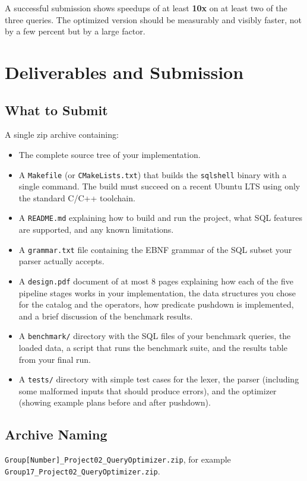 \documentclass[11pt,a4paper]{article}
\begin{document}
A successful submission shows speedups of at least \textbf{10x} on at least two of the three queries. The optimized version should be measurably and visibly faster, not by a few percent but by a large factor.

\section{Deliverables and Submission}

\subsection{What to Submit}
A single zip archive containing:
\begin{itemize}
\item The complete source tree of your implementation.
\item A \texttt{Makefile} (or \texttt{CMakeLists.txt}) that builds the \texttt{sqlshell} binary with a single command. The build must succeed on a recent Ubuntu LTS using only the standard C/C++ toolchain.
\item A \texttt{README.md} explaining how to build and run the project, what SQL features are supported, and any known limitations.
\item A \texttt{grammar.txt} file containing the EBNF grammar of the SQL subset your parser actually accepts.
\item A \texttt{design.pdf} document of at most 8 pages explaining how each of the five pipeline stages works in your implementation, the data structures you chose for the catalog and the operators, how predicate pushdown is implemented, and a brief discussion of the benchmark results.
\item A \texttt{benchmark/} directory with the SQL files of your benchmark queries, the loaded data, a script that runs the benchmark suite, and the results table from your final run.
\item A \texttt{tests/} directory with simple test cases for the lexer, the parser (including some malformed inputs that should produce errors), and the optimizer (showing example plans before and after pushdown).
\end{itemize}

\subsection{Archive Naming}
\texttt{Group[Number]\_Project02\_QueryOptimizer.zip}, for example \texttt{Group17\_Project02\_QueryOptimizer.zip}.
\end{document}
